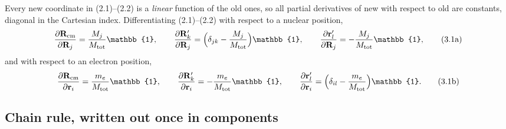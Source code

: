 \documentclass{article}
\begin{document}
Every new coordinate in (2.1)--(2.2) is a \emph{linear} function of the old ones, so all partial derivatives of new with respect to old are constants, diagonal in the Cartesian index. Differentiating (2.1)--(2.2) with respect to a nuclear position,
\begin{equation}
\frac{\partial\mathbf{R}_{\mathrm{cm}}}{\partial\mathbf{R}_j} = \frac{M_j}{M_{\mathrm{tot}}}\mathbb{1},\qquad \frac{\partial\mathbf{R}'_k}{\partial\mathbf{R}_j} = \Bigl(\delta_{jk}-\frac{M_j}{M_{\mathrm{tot}}}\Bigr)\mathbb{1},\qquad \frac{\partial\mathbf{r}'_l}{\partial\mathbf{R}_j} = -\frac{M_j}{M_{\mathrm{tot}}}\mathbb{1}, \tag{3.1a}
\end{equation}
and with respect to an electron position,
\begin{equation}
\frac{\partial\mathbf{R}_{\mathrm{cm}}}{\partial\mathbf{r}_i} = \frac{m_e}{M_{\mathrm{tot}}}\mathbb{1},\qquad \frac{\partial\mathbf{R}'_k}{\partial\mathbf{r}_i} = -\frac{m_e}{M_{\mathrm{tot}}}\mathbb{1},\qquad \frac{\partial\mathbf{r}'_l}{\partial\mathbf{r}_i} = \Bigl(\delta_{il}-\frac{m_e}{M_{\mathrm{tot}}}\Bigr)\mathbb{1}. \tag{3.1b}
\end{equation}

\subsection{Chain rule, written out once in components}
\end{document}
